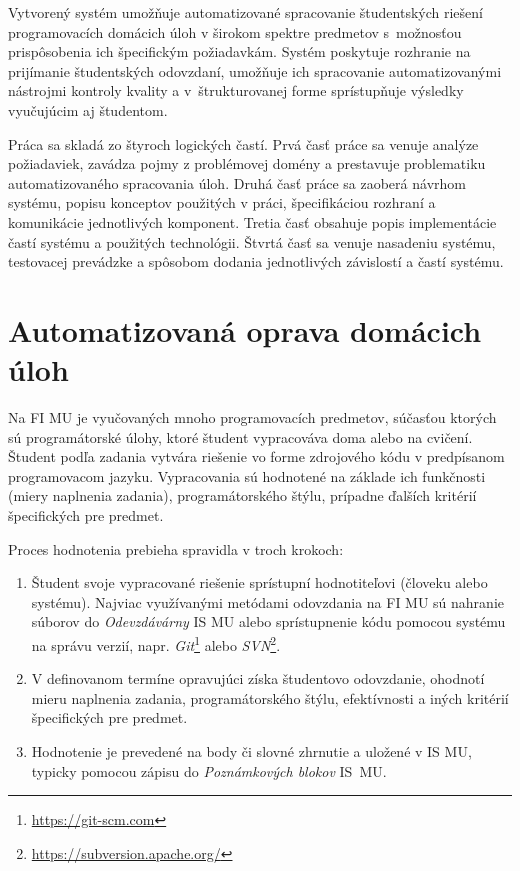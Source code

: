 \documentclass[
  digital, %
  oneside, %
  table,   %
  lof,     %
  lot,   %
]{fithesis3}
\begin{document}
Vytvorený systém umožňuje automatizované spracovanie študentských riešení programovacích domácich úloh v širokom spektre predmetov s~možnosťou prispôsobenia ich špecifickým požiadavkám. Systém poskytuje rozhranie na prijímanie študentských odovzdaní, umožňuje ich spracovanie automatizovanými nástrojmi kontroly kvality a v~štrukturovanej forme sprístupňuje výsledky vyučujúcim aj študentom.

Práca sa skladá zo štyroch logických častí. Prvá časť práce sa venuje analýze požiadaviek, zavádza pojmy z problémovej domény a prestavuje problematiku automatizovaného spracovania úloh. Druhá časť práce sa zaoberá návrhom systému, popisu konceptov použitých v práci, špecifikáciou rozhraní a komunikácie jednotlivých komponent. Tretia časť obsahuje popis implementácie častí systému a použitých technológii. Štvrtá časť sa venuje nasadeniu systému, testovacej prevádzke a spôsobom dodania jednotlivých závislostí a častí systému. 


\chapter{Automatizovaná oprava domácich úloh}

Na FI MU je vyučovaných mnoho programovacích predmetov, súčasťou ktorých sú programátorské úlohy, ktoré študent vypracováva doma alebo na cvičení. Študent podľa zadania vytvára riešenie vo forme zdrojového kódu v predpísanom programovacom jazyku. Vypracovania sú hodnotené na základe ich funkčnosti (miery naplnenia zadania), programátorského štýlu, prípadne ďalších kritérií špecifických pre predmet. 

Proces hodnotenia prebieha spravidla v troch krokoch:
\begin{enumerate}
    \item Študent svoje vypracované riešenie sprístupní hodnotiteľovi (človeku alebo systému). Najviac využívanými metódami odovzdania na FI MU sú nahranie súborov do \textit{Odevzdávárny} IS MU alebo sprístupnenie kódu pomocou systému na správu verzií, napr. \textit{Git}\footnote{\url{https://git-scm.com}} alebo \textit{SVN}\footnote{\url{https://subversion.apache.org/}}. 
    \item V definovanom termíne opravujúci získa študentovo odovzdanie, ohodnotí mieru naplnenia zadania, programátorského štýlu, efektívnosti a iných kritérií špecifických pre predmet. 
    \item Hodnotenie je prevedené na body či slovné zhrnutie a uložené v IS MU, typicky pomocou zápisu do \emph{Poznámkových blokov} IS~MU.
\end{enumerate}
\end{document}
